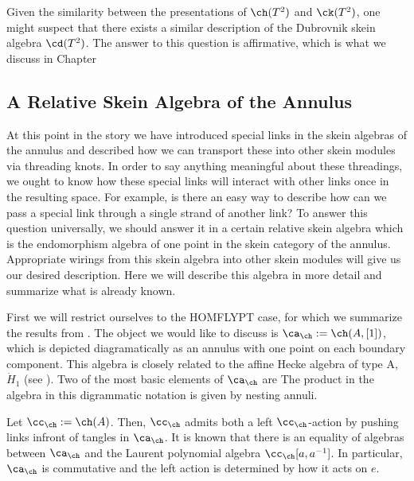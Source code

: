 Given the similarity between the presentations of $\ch(T^2)$ and $\ck(T^2)$, one might suspect that there exists a similar description of the Dubrovnik skein algebra $\cd(T^2)$. The answer to this question is affirmative, which is what we discuss in Chapter 


\subsection{A Relative Skein Algebra of the Annulus} \label{sec:relativeannulus}

At this point in the story we have introduced special links in the skein algebras of the annulus and described how we can transport these into other skein modules via threading knots. In order to say anything meaningful about these threadings, we ought to know how these special links will interact with other links once in the resulting space. For example, is there an easy way to describe how can we pass a special link through a single strand of another link? To answer this question universally, we should answer it in a certain relative skein algebra which is the endomorphism algebra of one point in the skein category of the annulus. Appropriate wirings from this skein algebra into other skein modules will give us our desired description. Here we will describe this algebra in more detail and summarize what is already known. 

First we will restrict ourselves to the HOMFLYPT case, for which we summarize the results from . The object we would like to discuss is $\ca_\ch := \ch(A, [1])$, which is depicted diagramatically as an annulus with one point on each boundary component. This algebra is closely related to the affine Hecke algebra of type A, $\dot{H}_1$ (see ). Two of the most basic elements of $\ca_\ch$ are
The product in the algebra in this digrammatic notation is given by nesting annuli. 

Let $\cc_\ch := \ch(A)$. Then, $\cc_\ch$ admits both a left $\cc_\ch$-action by pushing links infront of tangles in $\ca_\ch$.
It is known that there is an equality of algebras between $\ca_\ch$ and the Laurent polynomial algebra $\cc_\ch[a, a^{-1}]$. In particular, $\ca_\ch$ is commutative and the left action is determined by how it acts on $e$.

